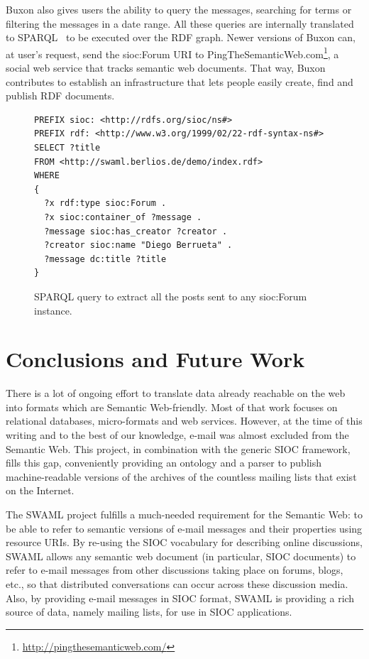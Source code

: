 \documentclass{llncs}
\begin{document}
Buxon also gives users the ability to query the messages, searching
for terms or filtering the messages in a date range. All these queries
are internally translated to SPARQL~\cite{SPARQLProtocol} to be executed
over the RDF graph. Newer versions of Buxon can, at user's request, send 
the \textsf{sioc:Forum} URI to PingTheSemanticWeb.com\footnote{\url{http://pingthesemanticweb.com/}}, 
a social web service that tracks semantic web documents. That way, Buxon
contributes to establish an infrastructure that lets people easily create, 
find and publish RDF documents.

\begin{figure}[ht]
\lstset{language=SPARQL}
\begin{lstlisting}
PREFIX sioc: <http://rdfs.org/sioc/ns#>
PREFIX rdf: <http://www.w3.org/1999/02/22-rdf-syntax-ns#>
SELECT ?title
FROM <http://swaml.berlios.de/demo/index.rdf>
WHERE
{
  ?x rdf:type sioc:Forum .
  ?x sioc:container_of ?message .
  ?message sioc:has_creator ?creator .
  ?creator sioc:name "Diego Berrueta" .
  ?message dc:title ?title
}
\end{lstlisting}
\caption{SPARQL query to extract all the posts sent to any \textsf{sioc:Forum} instance.}
\label{fig:sparqlquery}
\end{figure}

\section{\label{sec:conclusions}Conclusions and Future Work}

There is a lot of ongoing effort to translate data already reachable
on the web into formats which are Semantic Web-friendly. Most of that 
work focuses on relational databases, micro-formats and web services. 
However, at the time of this writing and to the best of our knowledge, 
e-mail was almost excluded from the Semantic Web. This project, in 
combination with the generic SIOC framework, fills this gap, conveniently 
providing an ontology and a parser to publish machine-readable versions 
of the archives of the countless mailing lists that exist on the Internet.

The SWAML project fulfills a much-needed requirement for the Semantic Web: 
to be able to refer to semantic versions of e-mail messages and their 
properties using resource URIs. By re-using the SIOC vocabulary for describing
online discussions, SWAML allows any semantic web document (in particular,
SIOC documents) to refer to
e-mail messages 
from other discussions taking place on forums, blogs, etc., so that distributed 
conversations can occur across these discussion media. Also, by providing e-mail 
messages in SIOC format, SWAML is providing a rich source of data, namely 
mailing lists, for use in SIOC applications.
\end{document}
